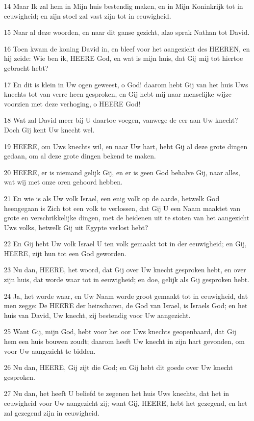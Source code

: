 \par 14 Maar Ik zal hem in Mijn huis bestendig maken, en in Mijn Koninkrijk tot in eeuwigheid; en zijn stoel zal vast zijn tot in eeuwigheid.
\par 15 Naar al deze woorden, en naar dit ganse gezicht, alzo sprak Nathan tot David.
\par 16 Toen kwam de koning David in, en bleef voor het aangezicht des HEEREN, en hij zeide: Wie ben ik, HEERE God, en wat is mijn huis, dat Gij mij tot hiertoe gebracht hebt?
\par 17 En dit is klein in Uw ogen geweest, o God! daarom hebt Gij van het huis Uws knechts tot van verre heen gesproken, en Gij hebt mij naar menselijke wijze voorzien met deze verhoging, o HEERE God!
\par 18 Wat zal David meer bij U daartoe voegen, vanwege de eer aan Uw knecht? Doch Gij kent Uw knecht wel.
\par 19 HEERE, om Uws knechts wil, en naar Uw hart, hebt Gij al deze grote dingen gedaan, om al deze grote dingen bekend te maken.
\par 20 HEERE, er is niemand gelijk Gij, en er is geen God behalve Gij, naar alles, wat wij met onze oren gehoord hebben.
\par 21 En wie is als Uw volk Israel, een enig volk op de aarde, hetwelk God heengegaan is Zich tot een volk te verlossen, dat Gij U een Naam maaktet van grote en verschrikkelijke dingen, met de heidenen uit te stoten van het aangezicht Uws volks, hetwelk Gij uit Egypte verlost hebt?
\par 22 En Gij hebt Uw volk Israel U ten volk gemaakt tot in der eeuwigheid; en Gij, HEERE, zijt hun tot een God geworden.
\par 23 Nu dan, HEERE, het woord, dat Gij over Uw knecht gesproken hebt, en over zijn huis, dat worde waar tot in eeuwigheid; en doe, gelijk als Gij gesproken hebt.
\par 24 Ja, het worde waar, en Uw Naam worde groot gemaakt tot in eeuwigheid, dat men zegge: De HEERE der heirscharen, de God van Israel, is Israels God; en het huis van David, Uw knecht, zij bestendig voor Uw aangezicht.
\par 25 Want Gij, mijn God, hebt voor het oor Uws knechts geopenbaard, dat Gij hem een huis bouwen zoudt; daarom heeft Uw knecht in zijn hart gevonden, om voor Uw aangezicht te bidden.
\par 26 Nu dan, HEERE, Gij zijt die God; en Gij hebt dit goede over Uw knecht gesproken.
\par 27 Nu dan, het heeft U beliefd te zegenen het huis Uws knechts, dat het in eeuwigheid voor Uw aangezicht zij; want Gij, HEERE, hebt het gezegend, en het zal gezegend zijn in eeuwigheid.


